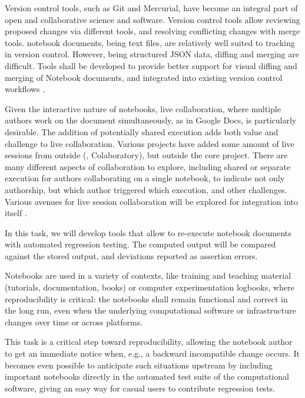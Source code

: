 \begin{workpackage}
\begin{tasklist}
\begin{task}[id=notebook-collab,title=Notebook improvements for collaboration,lead=SR, partners={PS,USH,JU,USO}]
  Version control tools, such as Git and Mercurial, have become an integral part of open and
  collaborative science and software. Version control tools allow reviewing proposed changes via
  different tools, and resolving conflicting changes with merge tools. \Jupyter notebook documents,
  being text files, are relatively well suited to tracking in version control. However, being
  structured JSON data, diffing and merging are difficult. Tools shall be developed to provide
  better support for visual diffing and merging of Notebook documents, and integrated into existing
  version control workflows .

  Given the interactive nature of \Jupyter notebooks, live collaboration, where multiple authors
  work on the document simultaneously, as in Google Docs, is particularly desirable. The addition
  of potentially shared execution adds both value and challenge to live collaboration. Various
  projects have added some amount of live sessions from outside (\SMC, Colaboratory), but
  outside the core project. There are many different aspects of collaboration to explore,
  including shared or separate execution for authors collaborating on a single notebook,
  to indicate not only authorship,
  but which author triggered which execution, and other challenges.
  Various avenues for live session collaboration will be explored for integration into \Jupyter itself
  .
\end{task}




\begin{task}[id=notebook-verification,title=Reproducible Notebooks,lead=SR, partners={PS,USO}]
  In this task, we will develop tools that allow to re-execute
  notebook documents with automated regression testing. The computed
  output will be compared against the stored output, and deviations
  reported as assertion errors.

  Notebooks are used in a variety of contexts, like training and
  teaching material (tutorials, documentation, books) or computer
  experimentation logbooks, where reproducibility is critical: the
  notebooks shall remain functional and correct in the long run, even
  when the underlying computational software or infrastructure changes
  over time or across platforms.

  This task is a critical step toward reproducibility, allowing the
  notebook author to get an immediate notice when, e.g., a backward
  incompatible change occurs. It becomes even possible to anticipate
  such situations upstream by including important notebooks directly
  in the automated test suite of the computational software, giving an
  easy way for casual users to contribute regression tests.


\end{task}
\end{tasklist}
\end{workpackage}

